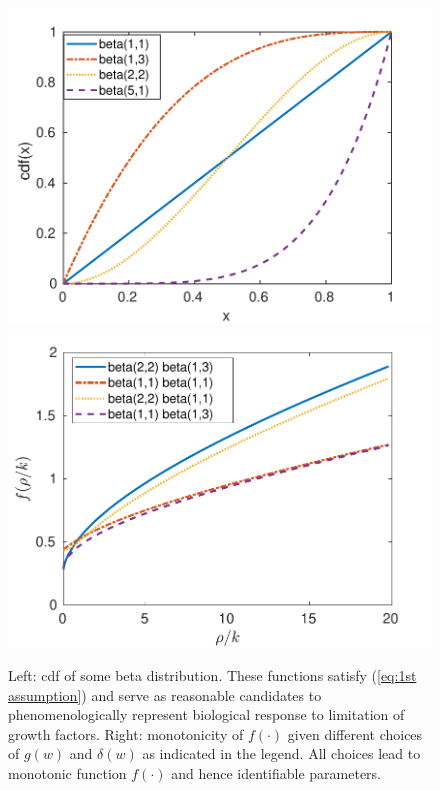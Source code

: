 \documentclass{aims}
\numberwithin{equation}{section}
\begin{document}
\begin{figure}
\begin{center}
\includegraphics[scale=0.5]{plots/frhok/betas-new}\includegraphics[scale=0.5]{plots/frhok/frhok-new}
\end{center}
\caption{\label{fig:beta =000026 f}Left: cdf of some beta distribution. These functions satisfy (\ref{eq:1st assumption})  and serve as reasonable candidates to phenomenologically represent biological response to limitation of growth factors. Right:
monotonicity of $f(\cdot)$ given different choices of $g(w)$ and $\delta(w)$ as indicated in the legend. All choices lead to monotonic function $f(\cdot)$ and hence identifiable parameters.}
\end{figure}
\end{document}

